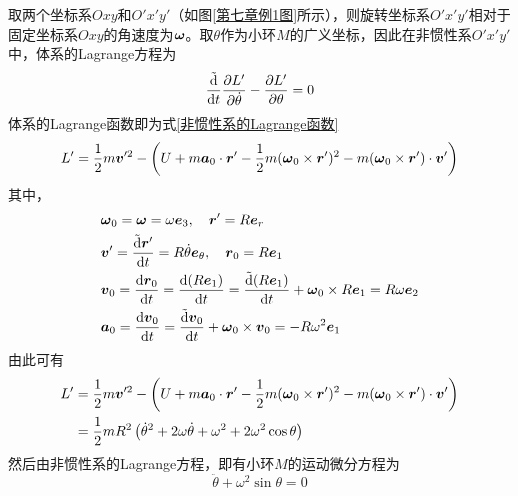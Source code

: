 \begin{solution}
取两个坐标系$Oxy$和$O'x'y'$（如图\ref{第七章例1图}所示），则旋转坐标系$O'x'y'$相对于固定坐标系$Oxy$的角速度为$\boldsymbol{\omega}$。取$\theta$作为小环$M$的广义坐标，因此在非惯性系$O'x'y'$中，体系的Lagrange方程为
\begin{equation*}
	\frac{\tilde{\mathrm{d}}}{\mathrm{d} t} \frac{\partial L'}{\partial \dot{\theta}} - \frac{\partial L'}{\partial \theta} = 0
\end{equation*}
体系的Lagrange函数即为式\eqref{非惯性系的Lagrange函数}
\begin{equation*}
	L' = \frac12 m\boldsymbol{v}'^2 - \left(U + m\boldsymbol{a}_0 \cdot \boldsymbol{r}' - \frac12 m(\boldsymbol{\omega}_0 \times \boldsymbol{r}')^2 - m(\boldsymbol{\omega}_0 \times \boldsymbol{r}') \cdot \boldsymbol{v}'\right)
\end{equation*}
其中，
\begin{align*}
	& \boldsymbol{\omega}_0 = \boldsymbol{\omega} = \omega \boldsymbol{e}_3,\quad \boldsymbol{r}' = R\boldsymbol{e}_r \\
	& \boldsymbol{v}' = \frac{\tilde{\mathrm{d}} \boldsymbol{r}'}{\mathrm{d} t} = R\dot{\theta} \boldsymbol{e}_\theta,\quad \boldsymbol{r}_0 = R\boldsymbol{e}_1 \\ 
	& \boldsymbol{v}_0 = \frac{\mathrm{d} \boldsymbol{r}_0}{\mathrm{d} t} = \frac{\mathrm{d} (R\boldsymbol{e}_1)}{\mathrm{d} t} = \frac{\tilde{\mathrm{d}} (R\boldsymbol{e}_1)}{\mathrm{d} t} + \boldsymbol{\omega}_0 \times R\boldsymbol{e}_1 = R\omega \boldsymbol{e}_2 \\
	& \boldsymbol{a}_0 = \frac{\mathrm{d} \boldsymbol{v}_0}{\mathrm{d} t} = \frac{\tilde{\mathrm{d}} \boldsymbol{v}_0}{\mathrm{d} t} + \boldsymbol{\omega}_0 \times \boldsymbol{v}_0 = -R\omega^2 \boldsymbol{e}_1
\end{align*}
由此可有
\begin{align*}
	L' & = \frac12 m\boldsymbol{v}'^2 - \left(U + m\boldsymbol{a}_0 \cdot \boldsymbol{r}' - \frac12 m(\boldsymbol{\omega}_0 \times \boldsymbol{r}')^2 - m(\boldsymbol{\omega}_0 \times \boldsymbol{r}') \cdot \boldsymbol{v}'\right) \\
	& = \frac12 mR^2 \left(\dot{\theta}^2 + 2\omega \dot{\theta} + \omega^2 + 2\omega^2 \cos \theta\right)
\end{align*}
然后由非惯性系的Lagrange方程，即有小环$M$的运动微分方程为
\begin{equation*}
	\ddot{\theta} + \omega^2 \sin \theta = 0
\end{equation*}


\end{solution}
